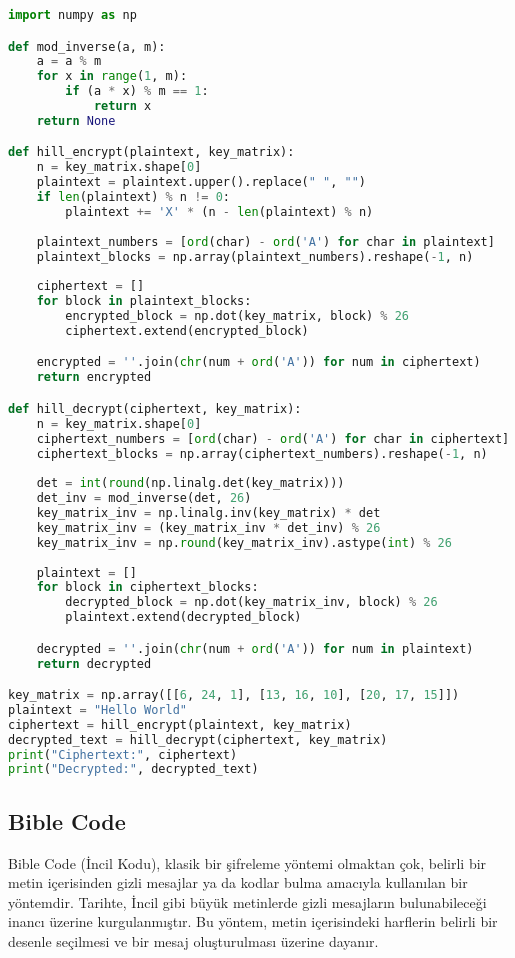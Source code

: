 \begin{lstlisting}[language=Python]
import numpy as np

def mod_inverse(a, m):
    a = a % m
    for x in range(1, m):
        if (a * x) % m == 1:
            return x
    return None

def hill_encrypt(plaintext, key_matrix):
    n = key_matrix.shape[0]
    plaintext = plaintext.upper().replace(" ", "")
    if len(plaintext) % n != 0:
        plaintext += 'X' * (n - len(plaintext) % n)
    
    plaintext_numbers = [ord(char) - ord('A') for char in plaintext]
    plaintext_blocks = np.array(plaintext_numbers).reshape(-1, n)
    
    ciphertext = []
    for block in plaintext_blocks:
        encrypted_block = np.dot(key_matrix, block) % 26
        ciphertext.extend(encrypted_block)

    encrypted = ''.join(chr(num + ord('A')) for num in ciphertext)
    return encrypted

def hill_decrypt(ciphertext, key_matrix):
    n = key_matrix.shape[0]
    ciphertext_numbers = [ord(char) - ord('A') for char in ciphertext]
    ciphertext_blocks = np.array(ciphertext_numbers).reshape(-1, n)
    
    det = int(round(np.linalg.det(key_matrix)))
    det_inv = mod_inverse(det, 26)
    key_matrix_inv = np.linalg.inv(key_matrix) * det
    key_matrix_inv = (key_matrix_inv * det_inv) % 26
    key_matrix_inv = np.round(key_matrix_inv).astype(int) % 26
    
    plaintext = []
    for block in ciphertext_blocks:
        decrypted_block = np.dot(key_matrix_inv, block) % 26
        plaintext.extend(decrypted_block)

    decrypted = ''.join(chr(num + ord('A')) for num in plaintext)
    return decrypted

key_matrix = np.array([[6, 24, 1], [13, 16, 10], [20, 17, 15]])
plaintext = "Hello World"
ciphertext = hill_encrypt(plaintext, key_matrix)
decrypted_text = hill_decrypt(ciphertext, key_matrix)
print("Ciphertext:", ciphertext)
print("Decrypted:", decrypted_text)
\end{lstlisting}

\newpage

\subsection{Bible Code}

Bible Code (İncil Kodu), klasik bir şifreleme yöntemi olmaktan çok, belirli bir metin içerisinden gizli mesajlar ya da kodlar bulma amacıyla kullanılan bir yöntemdir. Tarihte, İncil gibi büyük metinlerde gizli mesajların bulunabileceği inancı üzerine kurgulanmıştır. Bu yöntem, metin içerisindeki harflerin belirli bir desenle seçilmesi ve bir mesaj oluşturulması üzerine dayanır.

